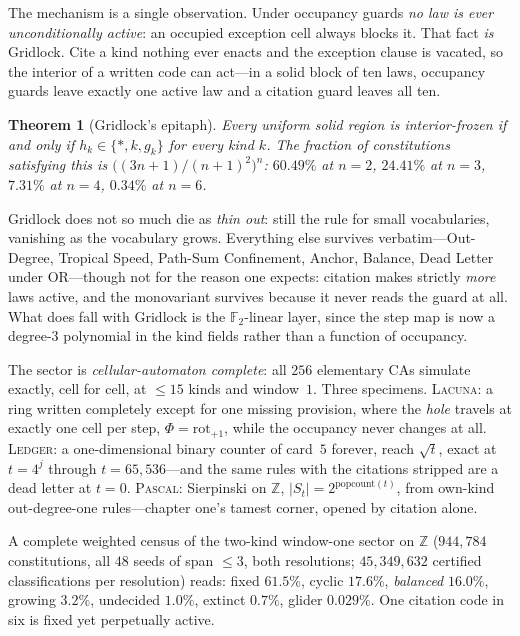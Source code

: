 \documentclass[10pt]{article}
\newtheorem{theorem}{Theorem}
\theoremstyle{definition}
\theoremstyle{remark}
\begin{document}
The mechanism is a single observation. Under occupancy guards \emph{no law is
ever unconditionally active}: an occupied exception cell always blocks it. That
fact \emph{is} Gridlock. Cite a kind nothing ever enacts and the exception
clause is vacated, so the interior of a written code can act---in a solid block
of ten laws, occupancy guards leave exactly one active law and a citation guard
leaves all ten.
\begin{theorem}[Gridlock's epitaph]
Every uniform solid region is interior-frozen if and only if
$h_k\in\{\ast,k,g_k\}$ for every kind $k$. The fraction of constitutions
satisfying this is $\big((3n+1)/(n+1)^2\big)^n$: $60.49\%$ at $n=2$, $24.41\%$
at $n=3$, $7.31\%$ at $n=4$, $0.34\%$ at $n=6$.
\end{theorem}
\noindent Gridlock does not so much die as \emph{thin out}: still the rule for
small vocabularies, vanishing as the vocabulary grows. Everything else survives
verbatim---Out-Degree, Tropical Speed, Path-Sum Confinement, Anchor, Balance,
Dead Letter under OR---though not for the reason one expects: citation makes
strictly \emph{more} laws active, and the monovariant survives because it never
reads the guard at all. What does fall with Gridlock is the $\mathbb{F}_2$-linear
layer, since the step map is now a degree-3 polynomial in the kind fields rather
than a function of occupancy.

The sector is \emph{cellular-automaton complete}: all $256$ elementary CAs
simulate exactly, cell for cell, at $\le15$ kinds and window~$1$. Three
specimens. \textsc{Lacuna}: a ring written completely except for one missing
provision, where the \emph{hole} travels at exactly one cell per step,
$\Phi=\mathrm{rot}_{+1}$, while the occupancy never changes at all.
\textsc{Ledger}: a one-dimensional binary counter of card~$5$ forever, reach
$\sqrt t$, exact at $t=4^j$ through $t=65{,}536$---and the same rules with the
citations stripped are a dead letter at $t=0$. \textsc{Pascal}: Sierpinski on
$\mathbb{Z}$, $|S_t|=2^{\mathrm{popcount}(t)}$, from own-kind out-degree-one
rules---chapter one's tamest corner, opened by citation alone.

A complete weighted census of the two-kind window-one sector on $\mathbb{Z}$
($944{,}784$ constitutions, all $48$ seeds of span $\le3$, both resolutions;
$45{,}349{,}632$ certified classifications per resolution) reads: fixed
$61.5\%$, cyclic $17.6\%$, \emph{balanced} $16.0\%$, growing $3.2\%$, undecided
$1.0\%$, extinct $0.7\%$, glider $0.029\%$. One citation code in six is fixed
yet perpetually active.
\end{document}
